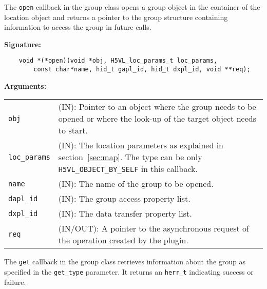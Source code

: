 The \texttt{open} callback in the group class opens a group object
in the container of the location object and returns a pointer to the
group structure containing information to access the group in future
calls.\bigskip

\begin{mdframed}[style=bgbox]
\textbf{Signature:}
\begin{lstlisting}
    void *(*open)(void *obj, H5VL_loc_params_t loc_params, 
        const char*name, hid_t gapl_id, hid_t dxpl_id, void **req);
\end{lstlisting}

\textbf{Arguments:}\\
\begin{tabular}{l p{10cm}}
  \texttt{obj} & (IN): Pointer to an object where the group needs to be
  opened or where the look-up of the target object needs to start.\\
  \texttt{loc\_params} & (IN): The location parameters as explained in
  section~\ref{sec:map}. The type can be only \texttt{H5VL\_OBJECT\_BY\_SELF} in this callback. \\
  \texttt{name} & (IN): The name of the group to be opened.\\
  \texttt{dapl\_id} & (IN): The group access property list.\\
  \texttt{dxpl\_id} & (IN): The data transfer property list.\\
  \texttt{req} & (IN/OUT): A pointer to the asynchronous request of the
  operation created by the plugin.\\
\end{tabular}
\end{mdframed}

The \texttt{get} callback in the group class retrieves information
about the group as specified in the \texttt{get\_type} parameter. It
returns an \texttt{herr\_t} indicating success or failure.\bigskip

